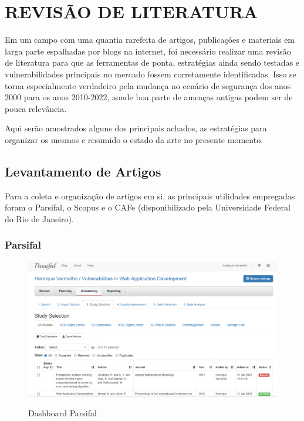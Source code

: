 \chapter{REVISÃO DE LITERATURA}
\label{chp:capitulo3}
Em um campo com uma quantia rarefeita de artigos, publicações e materiais em larga parte espalhadas por blogs na internet, foi necessário realizar uma revisão de literatura para que as ferramentas de ponta, estratégias ainda sendo testadas e vulnerabilidades principais no mercado fossem corretamente identificadas. Isso se torna especialmente verdadeiro pela mudança no cenário de segurança dos anos 2000 para os anos 2010-2022, aonde boa parte de ameaças antigas podem ser de pouca relevância.

Aqui serão amostrados alguns dos principais achados, as estratégias para organizar os mesmos e resumido o estado da arte no presente momento.

\section{Levantamento de Artigos}

Para a coleta e organização de artigos em si, as principais utilidades empregadas foram o Parsifal, o Scopus e o CAFe (disponibilizado pela Universidade Federal do Rio de Janeiro). 

\subsection{Parsifal}

\begin{figure}[ht]
    \centering
    \caption{Dashboard Parsifal}
    \includegraphics[width=14cm]{figuras/parsifal.png} 
    \label{fig:internet} 
\end{figure}

